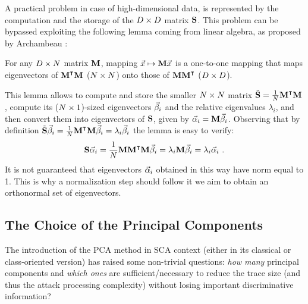 A practical problem in case of high-dimensional data, is represented by the computation and the storage of the $D\times D$ matrix $\textbf{S}$. This problem can be bypassed exploiting the following lemma coming from linear algebra, as proposed by Archambeau \etal \cite{TAprincipal}:
\begin{lemma}
For any $D\times N$ matrix $\textbf{M}$, mapping $\vec{x}\mapsto \textbf{M}\vec{x}$ is a one-to-one mapping that maps eigenvectors of $\textbf{M}^\intercal\textbf{M}$ ($N\times N$) onto those of $\textbf{M}\textbf{M}^\intercal$ ($D\times D$).
\end{lemma}
This lemma allows to compute and store the smaller $N\times N$ matrix $\tilde{\textbf{S}} = \frac{1}{N}\textbf{M}^\intercal\textbf{M}$, compute its ($N\times 1$)-sized eigenvectors $\vec{\beta}_i$ and the relative eigenvalues $\lambda_i$, and then convert them into eigenvectors of $\textbf{S}$, given by $\vec{\alpha}_i =\textbf{M} \vec{\beta}_i$. Observing that by definition $\tilde{\textbf{S}}\vec{\beta}_i =\frac{1}{N}\textbf{M}^\intercal\textbf{M}\vec{\beta}_i =  \lambda_i\vec{\beta}_i$ the lemma is easy to verify: 
\begin{equation}
\textbf{S}\vec{\alpha}_i = \frac{1}{N}\textbf{M}\textbf{M}^\intercal \textbf{M} \vec{\beta}_i = \lambda_i\textbf{M}\vec{\beta}_i = \lambda_i\vec{\alpha}_i \mbox{ .}
\end{equation}
It is not guaranteed that eigenvectors $\vec{\alpha}_i$ obtained in this way have norm equal to 1. This is why a normalization step should follow it we aim to obtain an orthonormal set of eigenvectors.



\subsection{The Choice of the Principal Components}\label{sec:ELV}
The introduction of the PCA method in SCA context (either in its classical or class-oriented version)  has raised some non-trivial questions: \textit{how many} principal components and \textit{which ones} are sufficient/necessary to reduce the trace size (and thus the attack processing complexity) without losing important discriminative information?\\

